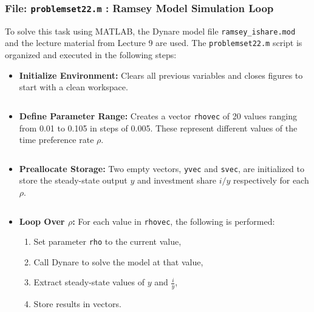 \documentclass[12pt,a4paper,notitlepage]{article}
\numberwithin{equation}{section}
\begin{document}
\begin{itemize}
  \subsubsection {   File: \texttt{problemset22.m} : Ramsey Model Simulation Loop}



To solve this task using MATLAB, the Dynare model file \texttt{ramsey\_ishare.mod} and the lecture material from Lecture 9 are used. The \texttt{problemset22.m} script is organized and executed in the following steps:

\begin{itemize}
  \item \textbf{Initialize Environment:} Clears all previous variables and closes figures to start with a clean workspace.
  \begin{lstlisting}
  \end{lstlisting}
  
  \item \textbf{Define Parameter Range:} Creates a vector \texttt{rhovec} of 20 values ranging from 0.01 to 0.105 in steps of 0.005. These represent different values of the time preference rate \( \rho \).
  \begin{lstlisting}
  \end{lstlisting}

  \item \textbf{Preallocate Storage:} Two empty vectors, \texttt{yvec} and \texttt{svec}, are initialized to store the steady-state output \( y \) and investment share \( i/y \) respectively for each \( \rho \).
  \begin{lstlisting}
  \end{lstlisting}
  
  \item \textbf{Loop Over \(\rho\):} For each value in \texttt{rhovec}, the following is performed:
  \begin{enumerate}
    \item Set parameter \texttt{rho} to the current value,
    \item Call Dynare to solve the model at that value,
    \item Extract steady-state values of \( y \) and \( \frac{i}{y} \),
    \item Store results in vectors.
  \end{enumerate}
  \begin{lstlisting}
  \end{lstlisting}
  
 \vspace{1em}
 

\end{itemize}
\end{itemize}
\end{document}
